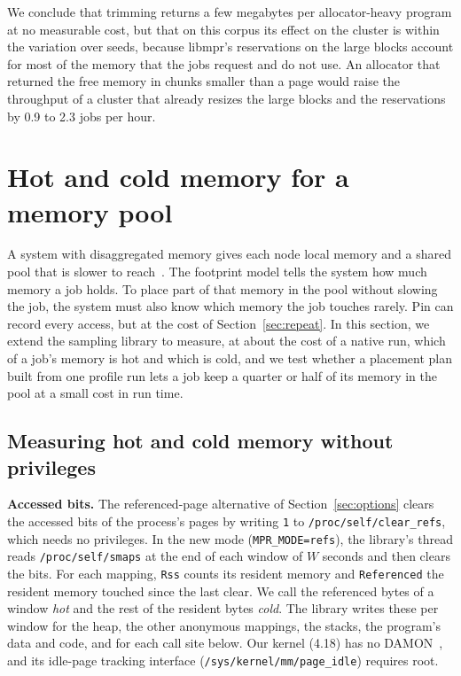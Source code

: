 \documentclass[11pt]{article}
\newcommand{\secref}[1]{Section~\ref{#1}}
\newcommand{\term}[1]{\emph{#1}}
\begin{document}
We conclude that trimming returns a few megabytes per allocator-heavy program at no measurable cost, but that on
this corpus its effect on the cluster is within the variation over seeds, because libmpr's reservations on the large
blocks account for most of the memory that the jobs request and do not use. An allocator that returned the free
memory in chunks smaller than a page would raise the throughput of a cluster that already resizes the large blocks and the reservations by 0.9
to 2.3 jobs per hour.

\section{Hot and cold memory for a memory pool}
\label{sec:place}

A system with disaggregated memory gives each node local memory and a shared pool that is slower to
reach~\cite{Li2023Pond,Peng2020Underutilization}. The footprint model tells the system how much memory a job holds.
To place part of that memory in the pool without slowing the job, the system must also know which memory the job
touches rarely. Pin can record every access, but at the cost of \secref{sec:repeat}. In this section, we extend the
sampling library to measure, at about the cost of a native run, which of a job's memory is hot and which is cold, and
we test whether a placement plan built from one profile run lets a job keep a quarter or half of its memory in the
pool at a small cost in run time.

\subsection{Measuring hot and cold memory without privileges}

\textbf{Accessed bits.} The referenced-page alternative of \secref{sec:options} clears the accessed bits of the
process's pages by writing \texttt{1} to \texttt{/proc/self/clear\_refs}, which needs no privileges. In the new mode
(\texttt{MPR\_MODE=refs}), the library's thread reads \texttt{/proc/self/smaps} at the end of each window of $W$
seconds and then clears the bits. For each mapping, \texttt{Rss} counts its resident memory and \texttt{Referenced}
the resident memory touched since the last clear. We call the referenced bytes of a window \term{hot} and the rest
of the resident bytes \term{cold}. The library writes these per window for the heap, the other anonymous mappings,
the stacks, the program's data and code, and for each call site below. Our kernel (4.18) has no
DAMON~\cite{park2019damon}, and its idle-page tracking interface (\texttt{/sys/kernel/mm/page\_idle}) requires
root.
\end{document}
